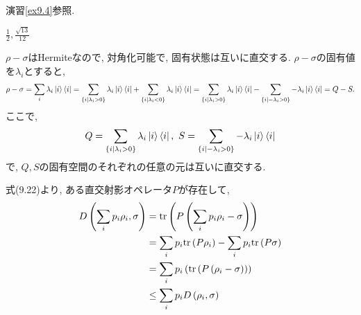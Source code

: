 \begin{ex}
    \label{ex9.5}
    演習\ref{ex9.4}参照.
\end{ex}

\begin{ex}
    \label{ex9.6}
    $\frac{1}{2}, \frac{\sqrt{13}}{12}$
\end{ex}

\begin{ex}
    \label{ex9.7}
    $\rho - \sigma$はHermiteなので, 対角化可能で, 固有状態は互いに直交する. $\rho - \sigma$の固有値を$\lambda_i$とすると,
    \begin{align*}
        \rho - \sigma = \sum_i \lambda_i \ket{i}\bra{i}=
        \sum_{\{i| \lambda_i > 0\}} \lambda_i \ket{i}\bra{i}
        +
        \sum_{\{i| \lambda_i < 0\}} \lambda_i \ket{i}\bra{i}
        =
        \sum_{\{i| \lambda_i > 0\}} \lambda_i \ket{i}\bra{i}
        -
        \sum_{\{i| -\lambda_i > 0\}} -\lambda_i \ket{i}\bra{i}
        =
        Q - S.
    \end{align*}
    ここで,
    \begin{align*}
        Q = \sum_{\{i| \lambda_i > 0\}} \lambda_i \ket{i}\bra{i}, \
        S = \sum_{\{i| - \lambda_i > 0\}} -\lambda_i \ket{i}\bra{i}
    \end{align*}
    で, $Q,S$の固有空間のそれぞれの任意の元は互いに直交する.
\end{ex}

\begin{ex}
    \label{ex9.8}
    式(9.22)より, ある直交射影オペレータ$P$が存在して,
    \begin{align*}
        D \left(\sum_i p_i \rho_i, \sigma\right)
         & =
        \mathrm{tr} \left( P \left( \sum_i p_i \rho_i - \sigma \right)\right)
        \\
         & =
        \sum_i p_i \mathrm{tr} \left( P \rho_i \right)
        -
        \sum_i p_i \mathrm{tr} \left( P \sigma\right)
        \\
         & =
        \sum_i p_i
        \left(
        \mathrm{tr} \left( P \left( \rho_i - \sigma \right) \right)
        \right)
        \\
         & \leq
        \sum_i p_i D\left(\rho_i, \sigma\right)
    \end{align*}
\end{ex}

